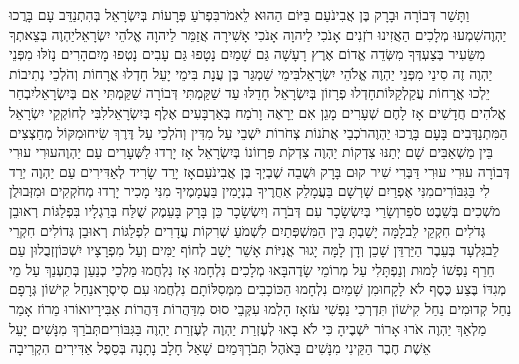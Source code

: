 \documentclass[../main/main.tex]{subfiles}
\begin{document}
\begin{multicols*}{\ncols}
וַתָּשַׁר דְּבוֹרָה וּבָרָק בֶּן אֲבִינֹעַם בַּיּוֹם הַהוּא לֵאמֹר\PreVerseSpace{}בִּפְרֹעַ פְּרָעוֹת בְּיִשְׂרָאֵל בְּהִתְנַדֵּב עָם בָּרֲכוּ יַהְוֶה\PreVerseSpace{}שִׁמְעוּ מְלָכִים הַאֲזִינוּ רֹזְנִים אָנֹכִי לַיהוָה אָנֹכִי אָשִׁירָה אֲזַמֵּר לַיהוָה אֱלֹהֵי יִשְׂרָאֵל\PreVerseSpace{}יַהְוֶה בְּצֵאתְךָ מִשֵּׂעִיר בְּצַעְדְּךָ מִשְּׂדֵה אֱדוֹם אֶרֶץ רָעָשָׁה גַּם שָׁמַיִם נָטָפוּ גַּם עָבִים נָטְפוּ מָיִם\PreVerseSpace{}הָרִים נָזֹלּוּ\SubEnd{} מִפְּנֵי יַהְוֶה זֶה סִינַי מִפְּנֵי יַהְוֶה אֱלֹהֵי יִשְׂרָאֵל\PreVerseSpace{}בִּימֵי שַׁמְגַּר בֶּן עֲנָת בִּימֵי יָעֵל חָדְלוּ אֳרָחוֹת וְהֹלְכֵי נְתִיבוֹת יֵלְכוּ אֳרָחוֹת עֲקַלְקַלּוֹת\PreVerseSpace{}חָדְלוּ פְרָזוֹן בְּיִשְׂרָאֵל חָדֵלּוּ עַד שַׁקַּמְתִּי דְּבוֹרָה שַׁקַּמְתִּי אֵם בְּיִשְׂרָאֵל\PreVerseSpace{}יִבְחַר אֱלֹהִים חֲדָשִׁים אָז לָחֶם שְׁעָרִים מָגֵן אִם יֵרָאֶה וָרֹמַח בְּאַרְבָּעִים אֶלֶף בְּיִשְׂרָאֵל\PreVerseSpace{}לִבִּי לְחוֹקְקֵי יִשְׂרָאֵל הַמִּתְנַדְּבִים בָּעָם בָּרֲכוּ יַהְוֶה\PreVerseSpace{}רֹכְבֵי אֲתֹנוֹת צְחֹרוֹת יֹשְׁבֵי עַל מִדִּין וְהֹלְכֵי עַל דֶּרֶךְ שִׂיחוּ\PreVerseSpace{}מִקּוֹל מְחַצְצִים בֵּין מַשְׁאַבִּים שָׁם יְתַנּוּ צִדְקוֹת יַהְוֶה צִדְקֹת פִּרְזוֹנוֹ בְּיִשְׂרָאֵל אָז יָרְדוּ לַשְּׁעָרִים עַם יַהְוֶה\PreVerseSpace{}עוּרִי עוּרִי דְּבוֹרָה עוּרִי עוּרִי דַּבְּרִי שִׁיר קוּם בָּרָק וּשֲׁבֵה שֶׁבְיְךָ בֶּן אֲבִינֹעַם\PreVerseSpace{}אָז יָרַד\SubEnd{} שָׂרִיד לְאַדִּירִים עַם\SubEnd{} יַהְוֶה יְרַד לִי בַּגִּבּוֹרִים\PreVerseSpace{}מִנִּי אֶפְרַיִם שָׁרְשָׁם בַּעֲמָלֵק אַחֲרֶיךָ בִנְיָמִין בַּעֲמָמֶיךָ מִנִּי מָכִיר יָרְדוּ מְחֹקְקִים וּמִזְּבוּלֻן מֹשְׁכִים בְּשֵׁבֶט סֹפֵר\PreVerseSpace{}וְשָׂרַי בְּיִשְׂשָׂכָר עִם דְּבֹרָה וְיִשְׂשָׂכָר כֵּן בָּרָק בָּעֵמֶק שֻׁלַּח בְּרַגְלָיו בִּפְלַגּוֹת רְאוּבֵן גְּדֹלִים חִקְקֵי לֵב\PreVerseSpace{}לָמָּה יָשַׁבְתָּ בֵּין הַמִּשְׁפְּתַיִם לִשְׁמֹעַ שְׁרִקוֹת עֲדָרִים לִפְלַגּוֹת רְאוּבֵן גְּדוֹלִים חִקְרֵי לֵב\PreVerseSpace{}גִּלְעָד בְּעֵבֶר הַיַּרְדֵּן שָׁכֵן וְדָן לָמָּה יָגוּר אֳנִיּוֹת אָשֵׁר יָשַׁב לְחוֹף יַמִּים וְעַל מִפְרָצָיו יִשְׁכּוֹן\PreVerseSpace{}זְבֻלוּן עַם חֵרֵף נַפְשׁוֹ לָמוּת וְנַפְתָּלִי עַל מְרוֹמֵי שָׂדֶה\PreVerseSpace{}בָּאוּ מְלָכִים נִלְחָמוּ אָז נִלְחֲמוּ מַלְכֵי כְנַעַן בְּתַעְנַךְ עַל מֵי מְגִדּוֹ בֶּצַע כֶּסֶף לֹא לָקָחוּ\PreVerseSpace{}מִן שָׁמַיִם נִלְחָמוּ הַכּוֹכָבִים מִמְּסִלּוֹתָם נִלְחֲמוּ עִם סִיסְרָא\PreVerseSpace{}נַחַל קִישׁוֹן גְּרָפָם נַחַל קְדוּמִים נַחַל קִישׁוֹן תִּדְרְכִי נַפְשִׁי עֹז\PreVerseSpace{}אָז הָלְמוּ עִקְּבֵי סוּס מִדַּהֲרוֹת דַּהֲרוֹת אַבִּירָיו\PreVerseSpace{}אוֹרוּ מֵרוֹז אָמַר מַלְאַךְ יַהְוֶה אֹרוּ אָרוֹר יֹשְׁבֶיהָ כִּי לֹא בָאוּ לְעֶזְרַת יַהְוֶה לְעֶזְרַת יַהְוֶה בַּגִּבּוֹרִים\PreVerseSpace{}תְּבֹרַךְ מִנָּשִׁים יָעֵל אֵשֶׁת חֶבֶר הַקֵּינִי מִנָּשִׁים בָּאֹהֶל תְּבֹרָךְ\PreVerseSpace{}מַיִם שָׁאַל חָלָב נָתָנָה בְּסֵפֶל אַדִּירִים הִקְרִיבָה 
\end{multicols*}
\end{document}
